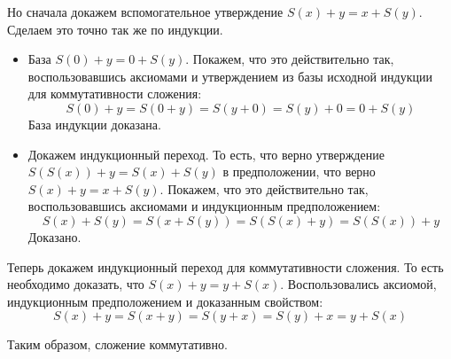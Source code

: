 \begin{enumerate}
\begin{itemize}
	Но сначала докажем вспомогательное утверждение $S(x) + y = x + S(y)$. Сделаем это точно так же по индукции.
	\begin{itemize}
		\item База $S(0) + y = 0 + S(y)$. Покажем, что это действительно так, воспользовавшись аксиомами и 
		утверждением из базы исходной индукции для коммутативности сложения:
		\begin{equation*}
			S(0) + y = S(0 + y) = S(y + 0) = S(y) + 0 = 0 + S(y)
		\end{equation*}
		База индукции доказана.
		\item Докажем индукционный переход. То есть, что верно утверждение $S(S(x)) + y = S(x) + S(y)$ в 
		предположении, что верно $S(x) + y = x + S(y)$. Покажем, что это действительно так, воспользовавшись 
		аксиомами и индукционным предположением:
		\begin{equation*}
			S(x) + S(y) = S(x + S(y)) = S(S(x) + y) = S(S(x)) + y
		\end{equation*}
		Доказано.
	\end{itemize}
	Теперь докажем индукционный переход для коммутативности сложения. То есть необходимо доказать, что $S(x) + y 
	= y + S(x)$. Воспользовались аксиомой, индукционным предположением и доказанным свойством:
	\begin{equation*}
		S(x) + y = S(x + y) = S(y + x) = S(y) + x = y + S(x)
 	\end{equation*}
\end{itemize}
Таким образом, сложение коммутативно.

\end{enumerate}
